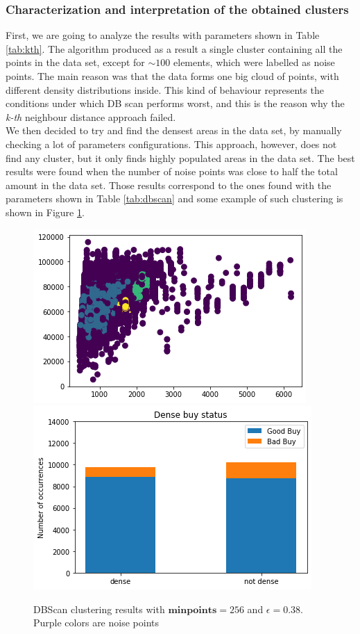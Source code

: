 \documentclass{article}
\begin{document}
	\subsubsection{Characterization and interpretation of the obtained clusters}
	\label{sec:dbscaneval}
	First, we are going to analyze the results with parameters shown in Table \ref{tab:kth}. The algorithm produced as a result a single cluster containing all the points in the data set, except for $\sim 100$ elements, which were labelled as noise points. The main reason was that the data forms one big cloud of points, with different density distributions inside. This kind of behaviour represents the conditions under which DB scan performs worst, and this is the reason why the \emph{k-th} neighbour distance approach failed. \\
	We then decided to try and find the densest areas in the data set, by manually checking a lot of parameters configurations. This approach, however, does not find any cluster, but it only finds highly populated areas in the data set. 
	The best results were found when the number of noise points was close to half the total amount in the data set. Those results correspond to the ones found with the parameters shown in Table \ref{tab:dbscan} and some example of such clustering is shown in Figure \ref{fig:dbscan}.
	
	\begin{figure}[H] 
		\centering
		\includegraphics[width=.40\textwidth]{cazzo}\hspace{1cm}
		\includegraphics[width=.4\textwidth]{bigboi}
		\caption{DBScan clustering results with $\mathbf{minpoints} = 256$ and $\epsilon = 0.38$. Purple colors are noise points}
		\label{fig:dbscan}
	\end{figure}
	
\end{document}
